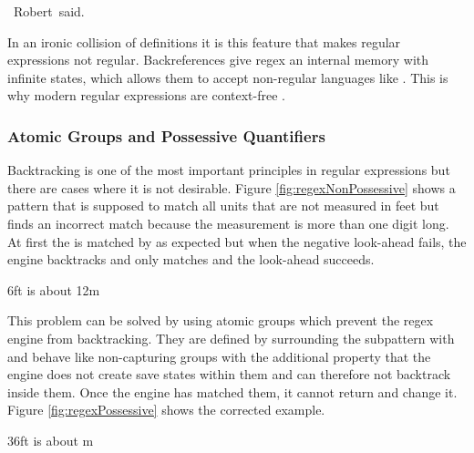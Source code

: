 \begin{listingBox}[title={Nested Quotes matched correctly by \pattern{("|').*?\bs 1}},label=fig:regexNestedQuotesBackref,width=14cm,center]
    ~Robert~said.
\end{listingBox}

In an ironic collision of definitions it is this feature that makes regular expressions not regular. Backreferences give regex an internal memory with infinite states, which allows them to accept non-regular languages like . This is why modern regular expressions are context-free \cite{regexIsContextFree}.

\subsubsection{Atomic Groups and Possessive Quantifiers}

Backtracking is one of the most important principles in regular expressions but there are cases where it is not desirable. Figure \ref{fig:regexNonPossessive} shows a pattern that is supposed to match all units that are not measured in feet but finds an incorrect match because the measurement is more than one digit long. At first the  is matched by  as expected but when the negative look-ahead fails, the engine backtracks and only matches  and the look-ahead succeeds.

\begin{listingBox}[title={Backtracking leads to incorrect Match with \pattern{\bs d+(?!ft)}},label=fig:regexNonPossessive,width=14cm,center]
    6ft is about 12m
\end{listingBox}

This problem can be solved by using atomic groups which prevent the regex engine from backtracking. They are defined by surrounding the subpattern with  and behave like non-capturing groups with the additional property that the engine does not create save states within them and can therefore not backtrack inside them. Once the engine has matched them, it cannot return and change it. Figure \ref{fig:regexPossessive} shows the corrected example.

\begin{listingBox}[title={Atomic Groups \pattern{(?>\bs d+)(?!ft)} prevent Backtracking},label=fig:regexPossessive,width=14cm,center]
    36ft is about m
\end{listingBox}

